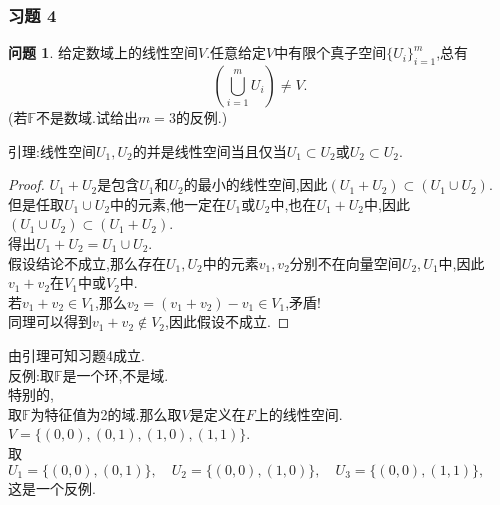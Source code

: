 \documentclass[11pt]{ctexart}
\theoremstyle{definition}
\newtheorem{qqq}{问题}[section]
\numberwithin{equation}{section}
\begin{document}
\subsubsection{习题 4}
\begin{qqq}
    给定数域上的线性空间$V$.任意给定$V$中有限个真子空间$\{U_i\}^m_{i=1}$,总有
    \begin{equation}
        \left(\bigcup ^m_{i=1}U_i\right)\neq V.
    \end{equation}
    (若$\mathbb{F}$不是数域.试给出$m=3$的反例.)
\end{qqq}
\begin{aaa}
    引理:线性空间$U_1,U_2$的并是线性空间当且仅当$U_1\subset U_2$或$U_2\subset U_2.$
    \begin{proof}
        $U_1+U_2$是包含$U_1$和$U_2$的最小的线性空间,因此$(U_1+U_2)\subset (U_1\cup U_2).$\\
        但是任取$U_1\cup U_2$中的元素,他一定在$U_1$或$U_2$中,也在$U_1+U_2$中,因此$(U_1\cup U_2)\subset (U_1+U_2)$.\\
        得出$U_1+U_2=U_1\cup U_2.$\\
        假设结论不成立,那么存在$U_1,U_2$中的元素$v_1,v_2$分别不在向量空间$U_2,U_1$中,因此$v_1+v_2$在$V_1$中或$V_2$中.\\
        若$v_1+v_2\in V_1$,那么$v_2=(v_1+v_2)-v_1\in V_1$,矛盾!\\
        同理可以得到$v_1+v_2 \notin V_2$,因此假设不成立.
    \end{proof}
    由引理可知习题4成立.\\
    \noindent 反例:取$\mathbb{F}$是一个环,不是域.\\
    特别的,\\
    取$\mathbb{F}$为特征值为2的域.那么取$V$是定义在$F$上的线性空间.$V=\{(0,0),(0,1),(1,0),(1,1)\}$.\\
    取$U_1=\{(0,0),(0,1)\},\quad U_2=\{(0,0),(1,0)\},\quad U_3=\{(0,0),(1,1)\},\quad$这是一个反例.
    
\end{aaa}
\end{document}
